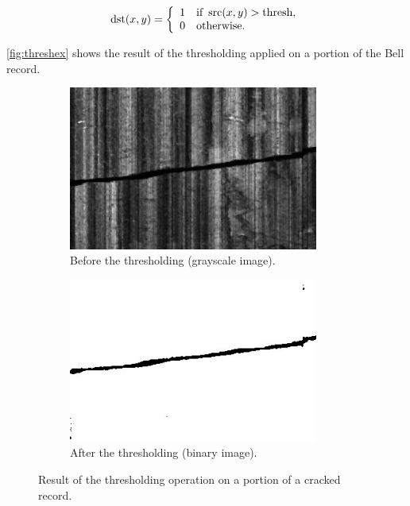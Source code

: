 \begin{equation}
\label{eq:thresh}
\operatorname{dst}(x, y) =
\left\{
\begin{array}{l l}
    1 & \text{if } \operatorname{src}(x, y) > \text{thresh},\\
    0 & \text{otherwise}.
\end{array}
\right.
\end{equation}

\autoref{fig:threshex} shows the result of the thresholding applied on a portion of the Bell record.

\begin{figure}[!ht]
\centering
    \begin{subfigure}[t]{0.45\textwidth}
    \centering
    \includegraphics[width=0.9\textwidth]{images/thresh-before}
    \caption{Before the thresholding (grayscale image).}
    \label{fig:threshbef}
    \end{subfigure}
    \begin{subfigure}[t]{0.45\textwidth}
    \centering
    \includegraphics[width=0.9\textwidth]{images/thresh-after}
    \caption{After the thresholding (binary image).}
    \label{fig:threshaft}
    \end{subfigure}
    \caption{Result of the thresholding operation on a portion of a cracked record.}
    \label{fig:threshex}
\end{figure}

